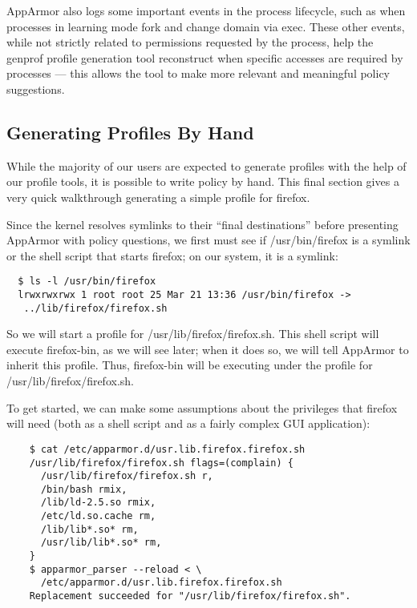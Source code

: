 \documentclass[a4paper]{article}
\renewcommand{\H}{\hspace{0pt}}
\begin{document}
AppArmor also logs some important events in the process lifecycle,
such as when processes in learning mode fork and change domain via
exec. These other events, while not strictly related to permissions
requested by the process, help the genprof profile generation tool
reconstruct when specific accesses are required by processes --- this
allows the tool to make more relevant and meaningful policy suggestions.

\subsection{Generating Profiles By Hand}

While the majority of our users are expected to generate profiles with
the help of our profile tools, it is possible to write policy by hand.
This final section gives a very quick walkthrough generating a simple
profile for firefox.

Since the kernel resolves symlinks to their ``final destinations'' before
presenting AppArmor with policy questions, we first must see if
/usr/{\H}bin/{\H}firefox is a symlink or the shell script that starts firefox;
on our system, it is a symlink:

\begin{small}
\begin{verbatim}
  $ ls -l /usr/bin/firefox
  lrwxrwxrwx 1 root root 25 Mar 21 13:36 /usr/bin/firefox ->
   ../lib/firefox/firefox.sh
\end{verbatim}
\end{small}

So we will start a profile for /usr/{\H}lib/{\H}firefox/{\H}firefox.sh. This shell
script will execute firefox-bin, as we will see later; when it does so,
we will tell AppArmor to inherit this profile. Thus, firefox-bin will
be executing under the profile for /usr/{\H}lib/{\H}firefox/{\H}firefox.sh.

To get started, we can make some assumptions about the privileges that
firefox will need (both as a shell script and as a fairly complex GUI
application):

\begin{small}
\begin{verbatim}
    $ cat /etc/apparmor.d/usr.lib.firefox.firefox.sh
    /usr/lib/firefox/firefox.sh flags=(complain) {
      /usr/lib/firefox/firefox.sh r,
      /bin/bash rmix,
      /lib/ld-2.5.so rmix,
      /etc/ld.so.cache rm,
      /lib/lib*.so* rm,
      /usr/lib/lib*.so* rm,
    }
    $ apparmor_parser --reload < \
      /etc/apparmor.d/usr.lib.firefox.firefox.sh
    Replacement succeeded for "/usr/lib/firefox/firefox.sh".
\end{verbatim}
\end{small}
\end{document}
